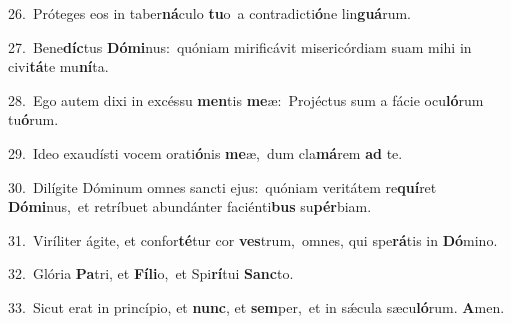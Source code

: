 {\numbfont\textcolor{\numbcolor}{26.}}~Próteges eos in taber\-\textbf{ná}\-culo \textbf{tu}\-o~\star a contradicti\-\textbf{ó}\-ne lin\-\textbf{guá}\-rum.\par
{\numbfont\textcolor{\numbcolor}{27.}}~Bene\-\textbf{díc}\-tus \textbf{Dó}\-\textbf{mi}nus:~\star quóniam mirificávit misericórdiam suam mihi in civi\-\textbf{tá}\-te mu\-\textbf{ní}\-ta.\par
{\numbfont\textcolor{\numbcolor}{28.}}~Ego autem dixi in excéssu \textbf{men}\-tis \textbf{me}\-æ:~\star Projéctus sum a fácie ocu\-\textbf{ló}\-rum tu\-\textbf{ó}\-rum.\par
{\numbfont\textcolor{\numbcolor}{29.}}~Ideo exaudísti vocem orati\-\textbf{ó}\-nis \textbf{me}\-æ,~\star dum cla\-\textbf{má}\-rem \textbf{ad} te.\par
{\numbfont\textcolor{\numbcolor}{30.}}~Dilígite Dóminum omnes sancti ejus:~\dagger quóniam veritátem re\-\textbf{quí}\-ret \textbf{Dó}\-\textbf{mi}nus,~\star et retríbuet abundánter faciénti\textbf{bus} su\-\textbf{pér}\-biam.\par
{\numbfont\textcolor{\numbcolor}{31.}}~Viríliter ágite, et confor\-\textbf{té}\-tur cor \textbf{ves}\-trum,~\star omnes, qui spe\-\textbf{rá}\-tis in \textbf{Dó}\-mino.\par
{\numbfont\textcolor{\numbcolor}{32.}}~Glória \textbf{Pa}\-tri, et \textbf{Fí}\-\textbf{li}o,~\star et Spi\-\textbf{rí}\-tui \textbf{Sanc}\-to.\par
{\numbfont\textcolor{\numbcolor}{33.}}~Sicut erat in princípio, et \textbf{nunc}\-, et \textbf{sem}\-per,~\star et in sǽcula sæcu\-\textbf{ló}\-rum. \textbf{A}\-men.\par

